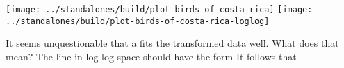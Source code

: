 \documentclass[../main.tex]{subfiles}
\begin{document}
\begin{example}
\begin{enumerate}[wide]
      \begin{center}
        \texttt{[image: ../standalones/build/plot-birds-of-costa-rica]}
        \quad
        \texttt{[image: ../standalones/build/plot-birds-of-costa-rica-loglog]}
      \end{center}

      It seems unquestionable that a \underline{\hspace{3in}} fits the transformed data well. What does that mean?  The line in log-log space should have the form
      It follows that 

  \end{enumerate}
\end{example}
\end{document}
